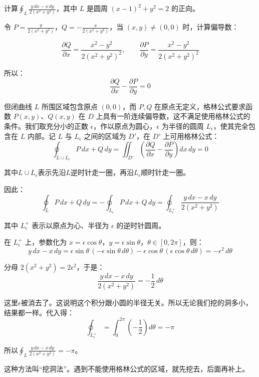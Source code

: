 \begin{myexample}
计算\(\oint_L \frac{y\,dx - x\,dy}{2(x^2 + y^2)}\)，其中 \(L\) 是圆周 \((x-1)^2 + y^2 = 2\) 的正向。
 
令
\(P = \frac{y}{2(x^2 + y^2)}\)，\(Q = -\frac{x}{2(x^2 + y^2)}\)，当 \((x,y) \neq (0,0)\) 时，计算偏导数：

\[
\frac{\partial Q}{\partial x} = \frac{x^2 - y^2}{2(x^2 + y^2)^2},\qquad
\frac{\partial P}{\partial y} = \frac{x^2 - y^2}{2(x^2 + y^2)^2}
\]

所以：
\[
\frac{\partial Q}{\partial x} - \frac{\partial P}{\partial y} = 0
\]

但闭曲线 \(L\) 所围区域包含原点 \((0,0)\)，而 \(P,Q\) 在原点无定义，格林公式要求函数 \(P(x,y)\)、\(Q(x,y)\) 在 \(D\) 上具有一阶连续偏导数，这不满足使用格林公式的条件。我们取充分小的正数 \(\epsilon\)，作以原点为圆心，\(\epsilon\) 为半径的圆周 \(L_\epsilon\)，使其完全包含在 \(L\) 内部。记 \(L\) 与 \(L_\epsilon\) 之间的区域为 \(D'\)，在 \(D'\) 上可用格林公式：  
\[
\oint_{L \cup L_\epsilon} P\,dx + Q\,dy = \iint_{D'} \left(\frac{\partial Q}{\partial x} - \frac{\partial P}{\partial y}\right) dx\,dy = 0
\]

其中\(L \cup L_\epsilon\)表示先沿\(L\)逆时针走一圈，再沿\(L_\epsilon\)顺时针走一圈。

因此：
\[
\oint_L P\,dx + Q\,dy = -\oint_{L_\epsilon} P\,dx + Q\,dy = \oint_{L_\epsilon^+} \frac{y\,dx - x\,dy}{2(x^2 + y^2)}
\]

其中 \(L_\epsilon^+\) 表示以原点为心、半径为 \(\epsilon\) 的逆时针圆周。

在 \(L_\epsilon^+\) 上，参数化为 \(x = \epsilon\cos\theta\)，\(y = \epsilon\sin\theta\)，\(\theta\in[0,2\pi]\)，则：
\[
y\,dx - x\,dy = \epsilon\sin\theta\,(-\epsilon\sin\theta\,d\theta) - \epsilon\cos\theta\,(\epsilon\cos\theta\,d\theta) = -\epsilon^2\,d\theta
\]

分母 \(2(x^2 + y^2) = 2\epsilon^2\)，于是：
\[
\frac{y\,dx - x\,dy}{2(x^2 + y^2)} = -\frac12\,d\theta
\]

这里\(\epsilon\)被消去了。这说明这个积分跟小圆的半径无关。所以无论我们挖的洞多小，结果都一样。代入得：
\[
\oint_{L_\epsilon^+} = \int_0^{2\pi} \left(-\frac12\right) d\theta = -\pi
\]

所以\(\oint_L \frac{y\,dx - x\,dy}{2(x^2 + y^2)} = -\pi
\)。

\end{myexample}

这种方法叫“挖洞法”。遇到不能使用格林公式的区域，就先挖去，后面再补上。

